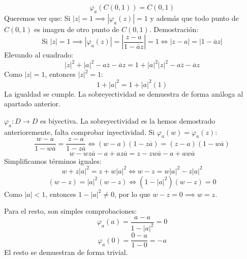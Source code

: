 {\[
\varphi_{a}(C(0,1)) = C(0,1)
\]
Queremos ver que: Si $|z|=1 \implies |\varphi_{a}(z)|=1$ y además que todo punto de $C(0,1)$ es imagen de otro punto de $C(0,1)$.
Demostración:
\[
\text{Si } |z|=1 \implies |\varphi_{a}(z)| = \left| \frac{z-a}{1-\overline{a}z} \right| = 1 \iff |z-a| = |1-\overline{a}z|
\]
Elevando al cuadrado:
\[
|z|^2 + |a|^2 - a\overline{z} - \overline{a}z = 1 + |a|^2|z|^2 - a\overline{z} - \overline{a}z
\]
Como $|z|=1$, entonces $|z|^2=1$:
\[
1 + |a|^2 = 1 + |a|^2(1)
\]
La igualdad se cumple.
La sobreyectividad se demuestra de forma análoga al apartado anterior.

$\varphi_{a}: D \to D$ es biyectiva. La sobreyectividad es la hemos demostrado anterioremente, falta comprobar inyectividad.
Si $\varphi_{a}(w) = \varphi_{a}(z)$:
\[
\frac{w-a}{1-w\overline{a}} = \frac{z-a}{1-z\overline{a}} \iff (w-a)(1-z\overline{a}) = (z-a)(1-w\overline{a})
\]
\[
w - wz\overline{a} - a + az\overline{a} = z - zw\overline{a} - a + aw\overline{a}
\]
Simplificamos términos iguales:
\[
w + z|a|^2 = z + w|a|^2 \iff w - z = w|a|^2 - z|a|^2
\]
\[
(w-z) = |a|^2(w-z) \iff (1-|a|^2)(w-z) = 0
\]
Como $|a|<1$, entonces $1-|a|^2 \neq 0$, por lo que $w-z=0 \implies w=z$.

Para el resto, son simples comprobaciones:
\[
\varphi_{a}(a) = \frac{a-a}{1-|a|^2} = 0
\]
\[
\varphi_{a}(0) = \frac{0-a}{1-0} = -a
\]
El resto se demuestran de forma trivial.
}

